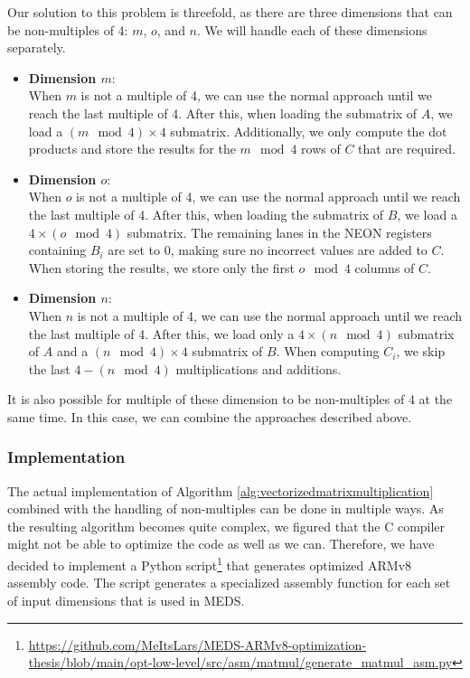 \documentclass[11pt,a4paper]{report}
\theoremstyle{definition}
\begin{document}
Our solution to this problem is threefold, as there are three dimensions that can be non-multiples of 4: $m$, $o$, and $n$. We will handle each of these dimensions separately.
\begin{itemize}
  \item \textbf{Dimension $m$}:\\
  When $m$ is not a multiple of 4, we can use the normal approach until we reach the last multiple of 4. After this, when loading the submatrix of $A$, we load a $(m \mod 4) \times 4$ submatrix. Additionally, we only compute the dot products and store the results for the $m \mod 4$ rows of $C$ that are required.
  \item \textbf{Dimension $o$}:\\
  When $o$ is not a multiple of 4, we can use the normal approach until we reach the last multiple of 4. After this, when loading the submatrix of $B$, we load a $4 \times (o \mod 4)$ submatrix. The remaining lanes in the NEON registers containing $B_i$ are set to 0, making sure no incorrect values are added to $C$. When storing the results, we store only the first $o \mod 4$ columns of $C$.
  \item \textbf{Dimension $n$}:\\
  When $n$ is not a multiple of 4, we can use the normal approach until we reach the last multiple of 4. After this, we load only a $4 \times (n \mod 4)$ submatrix of $A$ and a $(n \mod 4) \times 4$ submatrix of $B$. When computing $C_i$, we skip the last $4 - (n \mod 4)$ multiplications and additions.
\end{itemize}
It is also possible for multiple of these dimension to be non-multiples of 4 at the same time. In this case, we can combine the approaches described above.

\subsubsection{Implementation}
The actual implementation of Algorithm \ref{alg:vectorizedmatrixmultiplication} combined with the handling of non-multiples can be done in multiple ways. As the resulting algorithm becomes quite complex, we figured that the C compiler might not be able to optimize the code as well as we can. Therefore, we have decided to implement a Python script\footnote{\url{https://github.com/MeItsLars/MEDS-ARMv8-optimization-thesis/blob/main/opt-low-level/src/asm/matmul/generate\_matmul\_asm.py}} that generates optimized ARMv8 assembly code. The script generates a specialized assembly function for each set of input dimensions that is used in MEDS.
\end{document}

